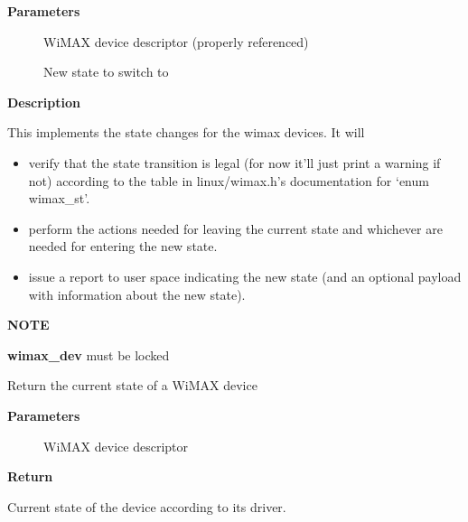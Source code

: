 \documentclass[a4paper,8pt,english]{sphinxmanual}
\begin{document}
\textbf{Parameters}
\begin{description}
\item[{}] \leavevmode
WiMAX device descriptor (properly referenced)

\item[{}] \leavevmode
New state to switch to

\end{description}

\textbf{Description}

This implements the state changes for the wimax devices. It will
\begin{itemize}
\item {} 
verify that the state transition is legal (for now it'll just
print a warning if not) according to the table in
linux/wimax.h's documentation for `enum wimax\_st'.

\item {} 
perform the actions needed for leaving the current state and
whichever are needed for entering the new state.

\item {} 
issue a report to user space indicating the new state (and an
optional payload with information about the new state).

\end{itemize}

\textbf{NOTE}

\textbf{wimax\_dev} must be locked

\begin{fulllineitems}
\label{networking/kapi:c.wimax_state_get}
Return the current state of a WiMAX device

\end{fulllineitems}


\textbf{Parameters}
\begin{description}
\item[{}] \leavevmode
WiMAX device descriptor

\end{description}

\textbf{Return}

Current state of the device according to its driver.
\end{document}
